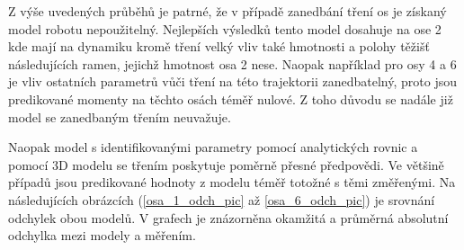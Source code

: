 Z výše uvedených průběhů je patrné, že v případě zanedbání tření os je získaný model robotu nepoužitelný. Nejlepších výsledků tento model dosahuje na ose 2 kde mají na dynamiku kromě tření velký vliv také hmotnosti a polohy těžišť následujících ramen, jejichž hmotnost osa 2 nese. Naopak například pro osy 4 a 6 je vliv ostatních parametrů vůči tření na této trajektorii zanedbatelný, proto jsou predikované momenty na těchto osách téměř nulové. Z toho důvodu se nadále již model se zanedbaným třením neuvažuje.

Naopak model s identifikovanými parametry pomocí analytických rovnic a pomocí 3D modelu se třením poskytuje poměrně přesné předpovědi. Ve většině případů jsou predikované hodnoty z modelu téměř totožné s těmi změřenými. Na následujících obrázcích (\ref{osa_1_odch_pic} až \ref{osa_6_odch_pic}) je srovnání odchylek obou modelů. V grafech je znázorněna okamžitá a průměrná absolutní odchylka mezi modely a měřením.

